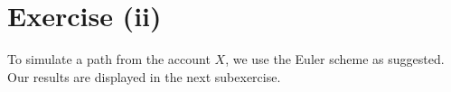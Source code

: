 \section*{Exercise (ii)}

To simulate a path from the account $X$, we use the Euler scheme as suggested. Our results
are displayed in the next subexercise.